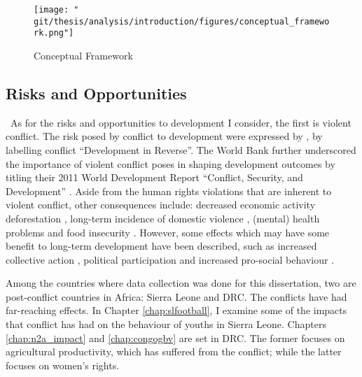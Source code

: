 \begin{figure}[htb]
  \centering
  \texttt{[image: "\\git/thesis/analysis/introduction/figures/conceptual\_framework.png"]}
  \caption{Conceptual Framework}
  \label{intro:fig:framework}
\end{figure}

\subsection{Risks and Opportunities}\
As for the risks and opportunities to development I consider, the first is violent conflict. The risk posed by conflict to development were expressed by \citet{Collier2003}, by labelling conflict ``Development in Reverse''. The World Bank further underscored the importance of violent conflict poses in shaping development outcomes by titling their 2011 World Development Report ``Conflict, Security, and Development'' \citep{WorldBank2011}. Aside from the human rights violations that are inherent to violent conflict, other consequences include: decreased economic activity \citep{Collier1999} deforestation \cite[e.g.][]{Connectiona}, long-term incidence of domestic violence \citep[e.g.][]{LaMattina2017, Muller2019}, (mental) health problems \cite[e.g.][]{Smith2002, Iqbal2006a,Akresh2011} and food insecurity \cite[e.g.][]{Lecoutere2005, Verwimp2012}. However, some effects which may have some benefit to long-term development have been described, such as increased collective action \citep{Bellows2009b}, political participation \citep{Blattman2009a} and increased pro-social behaviour \citep{Voors2012a}.

Among the countries where data collection was done for this dissertation, two are post-conflict countries in Africa: Sierra Leone and DRC. The conflicts have had far-reaching effects. In Chapter \ref{chap:slfootball}, I examine some of the impacts that conflict has had on the behaviour of youths in Sierra Leone. Chapters \ref{chap:n2a_impact} and \ref{chap:congogbv} are set in DRC. The former focuses on agricultural productivity, which has suffered from the conflict; while the latter focuses on women's rights. %

